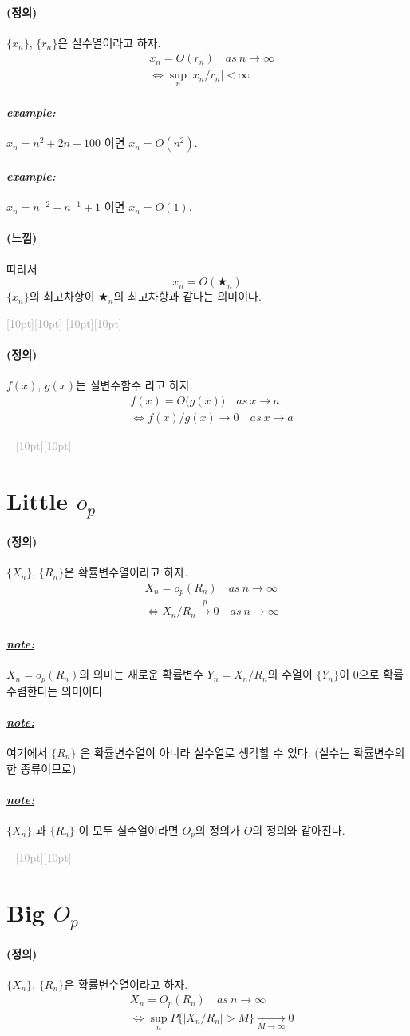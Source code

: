\documentclass[12pt,oneside,english]{book}
\newcommand{\dash}{\vspace{2em}\noindent \textcolor{darkgray}{\hrulefill~ \raisebox{-2.5pt}[10pt][10pt]{\leafright \decofourleft \decothreeleft  \aldineright \decotwo \floweroneleft \decoone   \floweroneright \decotwo \aldineleft\decothreeright \decofourright \leafleft} ~  \hrulefill \\ \vspace{2em}}}
\newcommand{\rdash}{\noindent \textcolor{darkgray}{ \raisebox{-1.9pt}[10pt][10pt]{\leafright} \hrulefill \raisebox{-1.9pt}[10pt][10pt]{\leafright \decofourleft \decothreeleft  \aldineright \decotwo \floweroneleft \decoone}}}
\def\dfn{\paragraph{\Large(정의)}\Large}
\def\fl{\paragraph{\Large(느낌)}\Large}
\def\note{\paragraph{\Large\textit{\underline{note:}}}\Large}
\def\ex{\paragraph{\Large\textit{example:}}\Large}
\begin{document}
\dfn $\{x_n\}$, $\{r_n\}$은 실수열이라고 하자. 
\begin{align*}
& x_n=O(r_n) \quad as~  n\to \infty \\
&\Longleftrightarrow \sup_n |x_n/r_n| < \infty 
\end{align*}

\ex $x_n=n^2+2n+100$ 이면 $x_n=O(n^2)$.

\ex $x_n=n^{-2}+n^{-1}+1$ 이면 $x_n=O(1)$.

\fl 따라서 
\[
x_n=O(\bigstar_n)
\]
$\{x_n\}$의 최고차항이 $\bigstar_n$의 최고차항과 같다는 의미이다. 

\rdash 

\dfn $f(x)$, $g(x)$는 실변수함수 라고 하자. 
\begin{align*}
& f(x)=O\big(g(x)\big) \quad as~  x\to a \\
&\Longleftrightarrow f(x)/g(x) \to 0 \quad as ~ x \to a
\end{align*}

\dash

\section{Little $o_p$}
\dfn $\{X_n\}$, $\{R_n\}$은 확률변수열이라고 하자. 
\begin{align*}
& X_n=o_p(R_n) \quad as ~ n\to \infty \\ 
& \Longleftrightarrow X_n/R_n \overset{p}{\to} 0 \quad as ~ n\to \infty 
\end{align*}

\note $X_n=o_p(R_n)$의 의미는 새로운 확률변수 $Y_n=X_n/R_n$의 수열이 $\{Y_n\}$이 $0$으로 확률수렴한다는 의미이다. 

\note 여기에서 $\{R_n\}$ 은 확률변수열이 아니라 실수열로 생각할 수 있다. (실수는 확률변수의 한 종류이므로)

\note $\{X_n\}$ 과 $\{R_n\}$ 이 모두 실수열이라면 $O_p$의 정의가 $O$의 정의와 같아진다. 

\dash

\section{Big $O_p$}
\dfn $\{X_n\}$, $\{R_n\}$은 확률변수열이라고 하자. 
\begin{align*}
& X_n=O_p(R_n) \quad as ~ n\to \infty \\ 
& \Longleftrightarrow \sup_{n}P\{|X_n/R_n|>M\} \underset{M\to\infty}{\to} 0
\end{align*}
\end{document}
